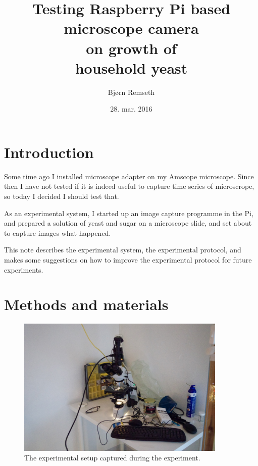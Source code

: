 \documentclass[12pt]{article}
\begin{document}
\title{Testing Raspberry Pi  based \\ microscope camera \\ on  growth
  of \\  household yeast}
\author{Bjørn Remseth}
\date{28. mar. 2016}
\maketitle
{}

\section{Introduction}

Some time ago I installed microscope adapter on my Amscope
microscope.   Since then I have not tested if it is indeed useful to
capture time series of microscrope, so today I decided I should test
that. 

As an experimental system, I started up an image capture programme in
the Pi, and prepared a solution of yeast and sugar on a microscope
slide, and set about to capture images what happened.

This note describes the experimental system, the experimental
protocol, and makes some suggestions on how to improve the
experimental protocol for future experiments.

\section{Methods and materials}

\begin{figure}[th]
\begin{center}
\includegraphics[width=10cm]{images/experimental_setup.jpg}
\caption{The experimental setup captured during the experiment.}
\label{lastimage}
\end{center}
\end{figure}
\end{document}
